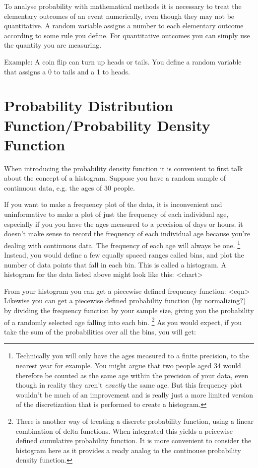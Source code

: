 \documentclass{article}
\begin{document}
To analyse probability with mathematical methods it is necessary to treat the elementary outcomes of an event numerically, even though they may not be quantitative.  A random variable assigns a number to each elementary outcome according to some rule you define.  For quantitative outcomes you can simply use the quantity you are measuring.


Example:   A coin flip can turn up heads or tails.  You define a random variable that assigns a 0 to tails and a 1 to heads.


\section{Probability Distribution Function/Probability Density Function}

When introducing the probability density function it is convenient to first talk about the concept of a histogram.  Suppose you have a random sample of continuous data, e.g. the ages of 30 people. 


If you want to make a frequency plot of the data, it is inconvenient and uninformative to make a plot of just the frequency of each individual age, especially if you you have the ages measured to a precision of days or hours.  it doesn't make sense to record the frequency of each individual age because you're dealing with continuous data.  The frequency of each age will always be one. \footnote{Technically you will only have the ages measured to a finite precision, to the nearest year for example.  You might argue that two people aged 34 would therefore be counted as the same age within the precision of your data, even though in reality they aren't \textit{exactly} the same age.  But this frequency plot wouldn't be much of an improvement and is really just a more limited version of the discretization that is performed to create a histogram.}  Instead, you would define a few equally spaced ranges called bins, and plot the number of data points that fall in each bin.  This is called a histogram.  A histogram for the data listed above might look like this:  <chart>


From your histogram you can get a piecewise defined frequency function:  <eqn>  Likewise you can get a piecewise defined probability function (by normalizing?) by dividing the frequency function by your sample size, giving you the probability of a randomly selected age falling into each bin.  \footnote{There is another way of treating a discrete probability function, using a linear combination of delta functions.  When integrated this yields a peicewise defined cumulative probability function.  It is more convenient to consider the histogram here as it provides a ready analog to the continouse probability density function.}  As you would expect, if you take the sum of the probabilities over all the bins, you will get: %
\end{document}
